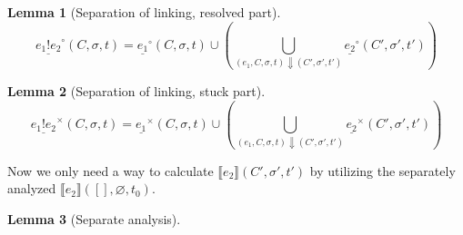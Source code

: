 \documentclass{article}
\newtheorem{lem}{Lemma}[section]
\theoremstyle{definition}
\newcommand*{\link}[2]{{#1}\mathtt{!}{#2}}
\newcommand*{\Stuck}[1]{\underline{#1}^{\times}}
\newcommand*{\Resolved}[1]{\underline{#1}^{\circ}}
\newcommand*{\sembracket}[1]{\lBrack{#1}\rBrack}
\begin{document}
\begin{lem}[Separation of linking, resolved part]
  \[
    \Resolved{\link{e_1}{e_2}}(C,\sigma,t)=
    \Resolved{e_1}(C,\sigma,t)\cup\left(\bigcup_{(e_1,C,\sigma,t)\Downarrow(C',\sigma',t')}{\Resolved{e_2}(C',\sigma',t')}\right)
  \]
\end{lem}

\begin{lem}[Separation of linking, stuck part]
  \[
    \Stuck{\link{e_1}{e_2}}(C,\sigma,t)=
    \Stuck{e_1}(C,\sigma,t)\cup\left(\bigcup_{(e_1,C,\sigma,t)\Downarrow(C',\sigma',t')}{\Stuck{e_2}(C',\sigma',t')}\right)
  \]
\end{lem}

Now we only need a way to calculate $\sembracket{e_{2}}(C',\sigma',t')$ by utilizing the separately analyzed $\sembracket{e_{2}}([],\varnothing,t_{0})$.



\begin{lem}[Separate analysis]
\end{lem}

\printbibliography
\end{document}
